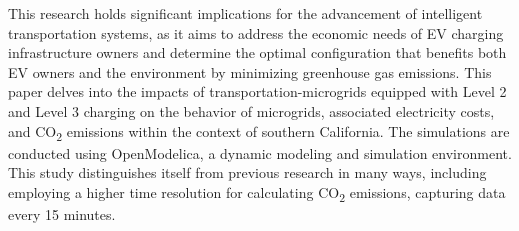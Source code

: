 \documentclass[conference]{IEEEtran}
\begin{document}
		This research holds significant implications for the advancement of intelligent transportation systems, as it aims to address the economic needs of EV charging infrastructure owners and determine the optimal configuration that benefits both EV owners and the environment by minimizing greenhouse gas emissions. This paper delves into the impacts of transportation-microgrids equipped with Level 2 and Level 3 charging on the behavior of microgrids, associated electricity costs, and CO\textsubscript{2} emissions within the context of southern California. The simulations are conducted using OpenModelica, a dynamic modeling and simulation environment. This study distinguishes itself from previous research in many ways, including employing a higher time resolution for calculating CO\textsubscript{2} emissions, capturing data every 15 minutes.
\end{document}
